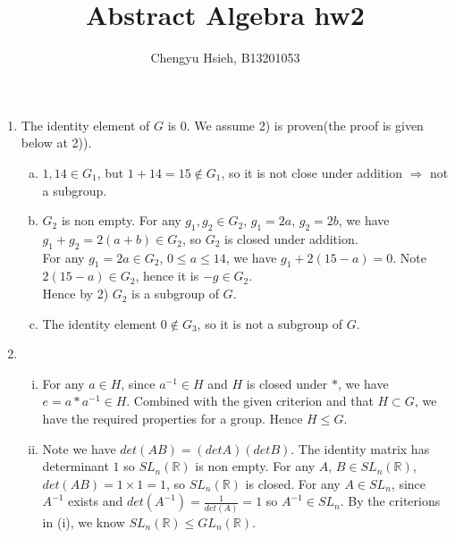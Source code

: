 \documentclass[A4paper,12pt]{article}
\title{Abstract Algebra hw2}
\author{Chengyu Hsieh, B13201053}
\date{}
\theoremstyle{definition}
\numberwithin{equation}{section}
\begin{document}
\maketitle
\begin{enumerate}[1)]
    \item
        The identity element of $G$ is $0$.
        We assume 2) is proven(the proof is given below at 2)).
        \begin{enumerate}[(a)]
            \item
                $1, 14 \in G_1$, but $1+14 = 15 \not \in G_1$, so it is not close under addition $\Rightarrow$ not a subgroup.
            \item
                $G_2$ is non empty.
                For any $g_1, g_2 \in G_2$, $g_1 = 2a,\, g_2 = 2b$, we have $g_1+g_2 = 2(a+b) \in G_2$, so $G_2$ is closed under addition.
                \\
                For any $g_1 = 2a \in G_2$, $0\leq a \leq 14$, we have $g_1 + 2(15-a) = 0$. Note $2(15-a) \in G_2$, hence it is $-g \in G_2$.
                \\
                Hence by 2) $G_2$ is a subgroup of $G$.
            \item
                The identity element $0 \not \in G_3$, so it is not a subgroup of $G$.
        \end{enumerate}

    \item
        \begin{enumerate}[(i)]
            \item
                For any $a \in H$, since $a^{-1} \in H$ and $H$ is closed under $*$, we have $e = a*a^{-1} \in H$. Combined with the given criterion and that $H \subset G$, we have the required properties for a group. Hence $H \leq G$.
            \item
                Note we have $det(AB) = (detA)(detB)$. 
                The identity matrix has determinant $1$ so $S\!L_n(\mathbb{R})$ is non empty.
                For any $A,\, B \in S\!L_n(\mathbb{R})$, $det(AB) = 1 \times 1 = 1$, so $S\!L_n(\mathbb{R})$ is closed. 
                For any $A \in S\!L_n$, since $A^{-1}$ exists and $det(A^{-1}) = \frac{1}{det(A)} = 1$ so $A^{-1} \in S\!L_n$. By the criterions in (i), we know $S\!L_n(\mathbb{R}) \le G\!L_n(\mathbb{R})$.

        \end{enumerate}


\end{enumerate}
\end{document}
